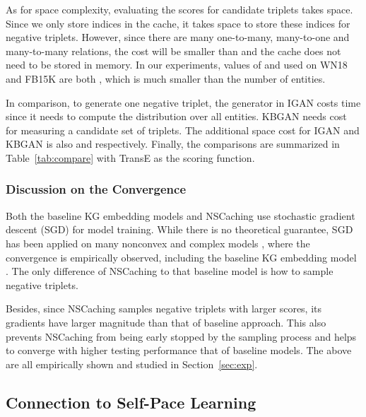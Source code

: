 \documentclass[conference]{IEEEtran}
\begin{document}
As for space complexity, 
evaluating the scores for  candidate triplets takes  space. 
Since we only store indices in the cache, 
it takes  space to store these indices for negative triplets.
However, since there are many one-to-many, many-to-one and many-to-many relations, 
the cost will be smaller than 
 and the cache does not need to be stored in memory.
In our experiments,
values of  and  used on WN18 and FB15K are both , 
which is much smaller than the number of entities.

In comparison, to generate one negative triplet, the generator in IGAN \cite{wang2018incorporating} costs  time since it needs to compute the distribution over all entities. 
KBGAN \cite{cai2018kbgan} needs  cost for measuring a candidate set of  triplets. The additional space cost for IGAN and KBGAN is also  and  respectively.
Finally,
the comparisons are summarized in Table~\ref{tab:compare} with TransE as the scoring function. 

 
\subsubsection{Discussion on the Convergence}


{
Both the baseline KG embedding models \cite{wang2017knowledge} and NSCaching use stochastic gradient descent (SGD) for model training.
While there is no theoretical guarantee,
SGD has been applied on many nonconvex and complex models \cite{kingma2014adam},
where the convergence is empirically observed,
including the baseline KG embedding model \cite{bordes2013translating,bordes2014semantic,wang2014knowledge,fan2014transition,trouillon2016complex,nickel2016holographic,liu2017analogical}.
The only difference of NSCaching to that baseline model is how to sample negative triplets.

Besides,
since NSCaching samples negative triplets with larger scores,
its gradients have larger magnitude than that of baseline approach. 
This also prevents NSCaching from being early stopped by the sampling process 
and helps to converge with higher testing performance that of baseline models.
The above are all empirically shown and studied in Section~\ref{sec:exp}.

}

\subsection{Connection to Self-Pace Learning}
\label{sec:self-pace}
\end{document}

